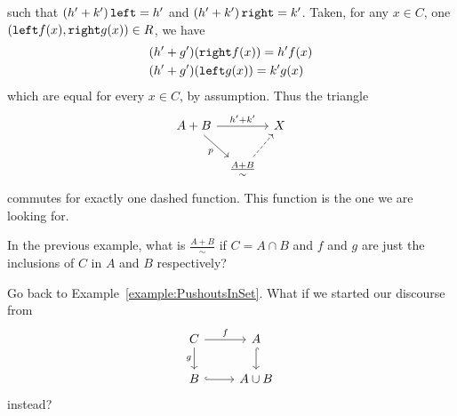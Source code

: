 \begin{example}
such that \(\left(h' + k'\right) \mathtt{left} =  h'\) and \(\left(h' + k'\right) \mathtt{right} =  k'\). Taken, for any \(x \in C\), one \((\mathtt{left} f(x), \mathtt{right} g(x)) \in R\), we have
\begin{align*}
& (h'+g')(\mathtt{right} f(x)) = h'f(x) \\
& (h'+g')(\mathtt{left} g(x)) = k'g(x) 
\end{align*}
which are equal for every \(x \in C\), by assumption.  Thus the triangle
\[\begin{tikzcd}[column sep=tiny]
A+B \ar["{h'+k'}", rr] \ar["p", dr, swap] & & X \\
 & \frac{A+B}{\sim} \ar[ur, dashed, swap]
\end{tikzcd}\]
commutes for exactly one dashed function. This function is the one we are looking for. 
\end{example}

\begin{exercise}
In the previous example, what is \(\frac{A+B}{\sim}\) if \(C = A \cap B\) and \(f\) and \(g\) are just the inclusions of \(C\) in \(A\) and \(B\) respectively? 
\end{exercise}

\begin{exercise}
Go back to Example~\ref{example:PushoutsInSet}. What if we started our discourse from
\[\begin{tikzcd}
C \ar["f", r] \ar["g", d, swap]  & A \ar[d, hookrightarrow] \\
B \ar[r, hookrightarrow]         & A \cup B
\end{tikzcd}\]
instead?
\end{exercise}

